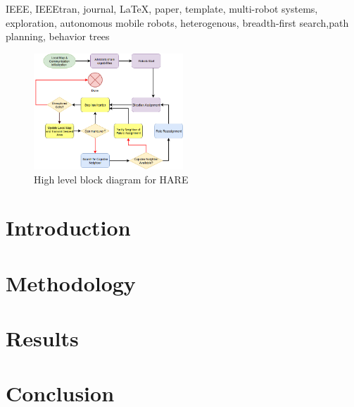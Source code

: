 \documentclass[conference]{IEEEtran}
\begin{document}
\begin{IEEEkeywords}
IEEE, IEEEtran, journal, \LaTeX, paper, template, multi-robot systems, exploration, autonomous mobile robots, heterogenous, breadth-first search,path planning, behavior trees
\end{IEEEkeywords}


\IEEEpeerreviewmaketitle

\begin{figure}[H]
  \centering
    \includegraphics[width=0.5\textwidth]{hare}
  \caption{High level block diagram for HARE}
  \label{fig:something3}
\end{figure}

\section{Introduction}


\section{Methodology}

\section{Results}

\section{Conclusion}
\end{document}

